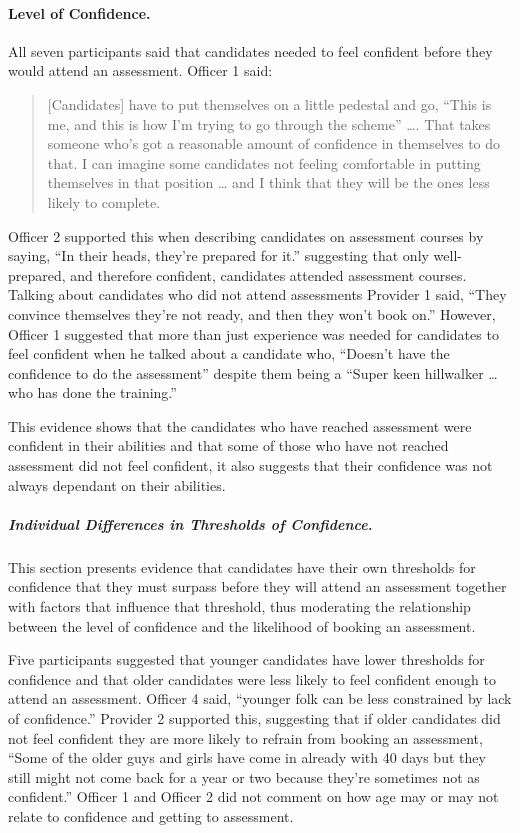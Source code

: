 \documentclass[
  12pt,
  a4paper,
]{book}
\begin{document}
\hypertarget{level-of-confidence.}{%
\paragraph{Level of Confidence.}\label{level-of-confidence.}}

All seven participants said that candidates needed to feel confident before they would attend an assessment. Officer 1 said:

\begin{quote}
{[}Candidates{]} have to put themselves on a little pedestal and go, ``This is me, and this is how I'm trying to go through the scheme'' \ldots. That takes someone who's got a reasonable amount of confidence in themselves to do that. I can imagine some candidates not feeling comfortable in putting themselves in that position \ldots{} and I think that they will be the ones less likely to complete.
\end{quote}

Officer 2 supported this when describing candidates on assessment courses by saying, ``In their heads, they're prepared for it.'' suggesting that only well-prepared, and therefore confident, candidates attended assessment courses. Talking about candidates who did not attend assessments Provider 1 said, ``They convince themselves they're not ready, and then they won't book on.'' However, Officer 1 suggested that more than just experience was needed for candidates to feel confident when he talked about a candidate who, ``Doesn't have the confidence to do the assessment'' despite them being a ``Super keen hillwalker \ldots{} who has done the training.''

This evidence shows that the candidates who have reached assessment were confident in their abilities and that some of those who have not reached assessment did not feel confident, it also suggests that their confidence was not always dependant on their abilities.

\hypertarget{study1-ind-diff-conf}{%
\subparagraph{Individual Differences in Thresholds of Confidence.}\label{study1-ind-diff-conf}}

This section presents evidence that candidates have their own thresholds for confidence that they must surpass before they will attend an assessment together with factors that influence that threshold, thus moderating the relationship between the level of confidence and the likelihood of booking an assessment.

Five participants suggested that younger candidates have lower thresholds for confidence and that older candidates were less likely to feel confident enough to attend an assessment. Officer 4 said, ``younger folk can be less constrained by lack of confidence.'' Provider 2 supported this, suggesting that if older candidates did not feel confident they are more likely to refrain from booking an assessment, ``Some of the older guys and girls have come in already with 40 days but they still might not come back for a year or two because they're sometimes not as confident.'' Officer 1 and Officer 2 did not comment on how age may or may not relate to confidence and getting to assessment.
\end{document}

